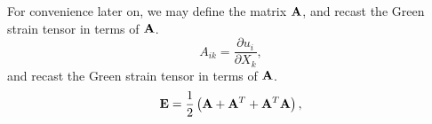 For convenience later on, we may define the matrix ${\bf{A}}$, and recast the Green strain tensor in terms of ${\bf{A}}$.
\begin{equation}
  \label{eq:A}
  A_{ik} = \frac{\partial u_i}{\partial X_k},
\end{equation}
 and recast the Green strain tensor in terms of ${\bf{A}}$.
 \begin{equation}
 \label{eq:H2E}
  {\bf{E}}= \frac{1}{2} \left( {\mathbf A} + {\mathbf A}^{T} + {\mathbf A}^{T}{\mathbf A} \right),
\end{equation}
